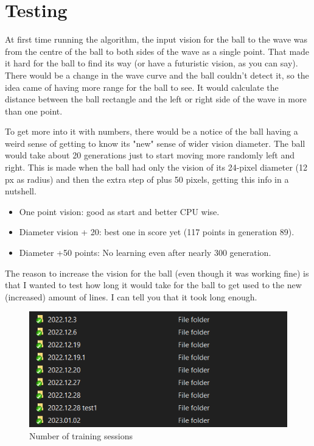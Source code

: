 \chapter{Testing}
At first time running the algorithm, the input vision for the ball to the wave was from the centre of the ball to both sides of the wave as a single point. That made it hard for the ball to find its way (or have a futuristic vision, as you can say). There would be a change in the wave curve and the ball couldn't detect it, so the idea came of having more range for the ball to see. It would calculate the distance between the ball rectangle and the left or right side of the wave in more than one point.

To get more into it with numbers, there would be a notice of the ball having a weird sense of getting to know its "new" sense of wider vision diameter. The ball would take about 20 generations just to start moving more randomly left and right. This is made when the ball had only the vision of its 24-pixel diameter (12 px as radius) and then the extra step of plus 50 pixels, getting this info in a nutshell.
\begin{itemize}
	\item One point vision: good as start and better CPU wise.
	\item Diameter vision + 20: best one in score yet (117 points in generation 89).
	\item Diameter +50 points: No learning even after nearly 300 generation.
\end{itemize}

The reason to increase the vision for the ball (even though it was working fine) is that I wanted to test how long it would take for the ball to get used to the new (increased) amount of lines. I can tell you that it took long enough.

\begin{figure}[H]
	\centering
	\includegraphics[width=0.7\linewidth]{usedImages/numTrainingSessions}
	\caption[]{Number of training sessions}
	\label{fig:numtrainingsessions}
\end{figure}


